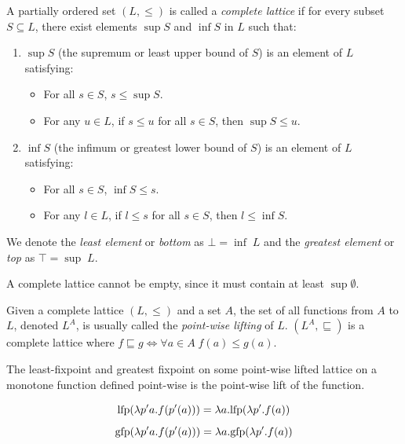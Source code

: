 \documentclass[
  10pt,       %
  twoside,    %
  a4paper,    %
  english,    %
  tikz,       %
  openright,  %
]{book}
\begin{document}
\begin{definition}
  A partially ordered set \((L, \leq)\) is called a \emph{complete lattice} if
  for every subset \(S \subseteq L\), there exist elements \(\sup S\) and
  \(\inf S\) in \(L\) such that: 
  \begin{enumerate}
    \item \(\sup S\) (the supremum or least upper bound of \(S\)) is an
      element of \(L\) satisfying: 
      \begin{itemize}
        \item For all \(s \in S\), \(s \leq \sup S\).
        \item For any \(u \in L\), if \(s \leq u\) for all \(s \in S\), then
          \(\sup S \leq u\). \end{itemize}
    \item \(\inf S\) (the infimum or greatest lower bound of \(S\)) is an
      element of \(L\) satisfying: 
      \begin{itemize}
        \item For all \(s \in S\), \(\inf S \leq s\).
        \item For any \(l \in L\), if \(l \leq s\) for all \(s \in S\), then
          \(l \leq \inf S\). 
      \end{itemize}
  \end{enumerate}

  We denote the \textit{least element} or \textit{bottom} as $\bot = \inf \; L$ 
  and the \textit{greatest element} or \textit{top} as $\top = \sup \; L$.
\end{definition}

\begin{observation}
  A complete lattice cannot be empty, since it must contain at least
  $\sup \emptyset$.
\end{observation}

\begin{definition}
Given a complete lattice $(L, \leq)$ and a set $A$, the set of all functions
from $A$ to $L$, denoted $L^A$, is usually called the \textit{point-wise
lifting} of $L$.
$(L^A, \sqsubseteq)$ is a complete lattice where $f \sqsubseteq g \iff \forall
a \in A \; f(a) \leq g(a)$.
\end{definition}

\begin{observation}
  \label{th:pointfix}
  The least-fixpoint and greatest fixpoint on some point-wise lifted lattice on 
  a monotone function defined point-wise is the point-wise lift of the function.

  $$\mathrm{lfp}(\lambda p' a . f(p'(a))) = \lambda a . \mathrm{lfp}(\lambda p' . f(a))$$
  $$\mathrm{gfp}(\lambda p' a . f(p'(a))) = \lambda a . \mathrm{gfp}(\lambda p' . f(a))$$
\end{observation}
\end{document}
